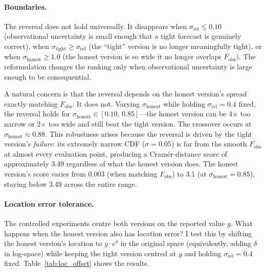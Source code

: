 \paragraph{Boundaries.}
The reversal does not hold universally. It disappears when $\sigma_\text{rel} \leq 0.10$ (observational uncertainty is small enough that a tight forecast is genuinely correct), when $\sigma_\text{tight} \geq \sigma_\text{rel}$ (the ``tight'' version is no longer meaningfully tight), or when $\sigma_\text{honest} \geq 1.0$ (the honest version is so wide it no longer overlaps $F_\text{obs}$). The reformulation changes the ranking only when observational uncertainty is large enough to be consequential.

A natural concern is that the reversal depends on the honest version's spread exactly matching $F_\text{obs}$. It does not. Varying $\sigma_\text{honest}$ while holding $\sigma_\text{rel} = 0.4$ fixed, the reversal holds for $\sigma_\text{honest} \in [0.10, \, 0.85]$---the honest version can be 4$\times$ too narrow or 2$\times$ too wide and still beat the tight version. The crossover occurs at $\sigma_\text{honest} \approx 0.88$. This robustness arises because the reversal is driven by the tight version's \emph{failure}: its extremely narrow CDF ($\sigma = 0.05$) is far from the smooth $F_\text{obs}$ at almost every evaluation point, producing a Cram\'er-distance score of approximately 3.49 regardless of what the honest version does. The honest version's score varies from 0.003 (when matching $F_\text{obs}$) to 3.1 (at $\sigma_\text{honest} = 0.85$), staying below 3.49 across the entire range.

\paragraph{Location error tolerance.}
The controlled experiments centre both versions on the reported value $y$. What happens when the honest version also has location error? I test this by shifting the honest version's location to $y \cdot e^\delta$ in the original space (equivalently, adding $\delta$ in log-space) while keeping the tight version centred at $y$ and holding $\sigma_\text{rel} = 0.4$ fixed. Table~\ref{tab:loc_offset} shows the results.

